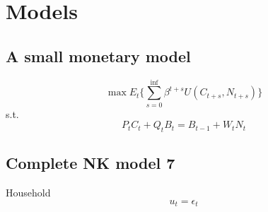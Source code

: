 \documentclass[11pt,a4paper,english]{article} %
\begin{document}
	\section{Models}
	\subsection{A small monetary model}
	\[
	\max E_t \{ \sum_{s=0}^{\inf} \beta^{t+s} U(C_{t+s}, N_{t+s}) \} 
	\]
	s.t.
	\[
	P_t C_t + Q_t B_t = B_{t-1} + W_t N_t 
	\]
	
	
	
	
	\subsection{Complete NK model 7}
	Household
	\[
		u_t = \epsilon_t
	\]
	
\end{document}
